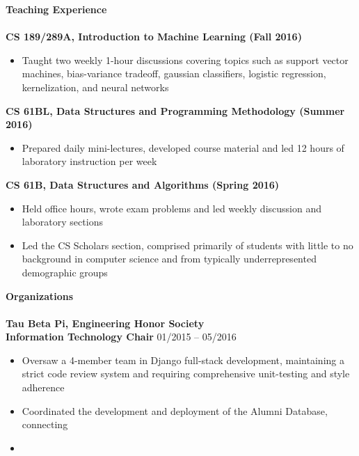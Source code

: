 \documentclass{article}
\begin{document}
\noindent
\textbf{{\Large Teaching Experience}}\\[-2mm]
\HRule\\
\textbf{CS 189/289A, Introduction to Machine Learning (Fall 2016)}
\begin{itemize}
\vspace{-1.8mm}
\item Taught two weekly 1-hour discussions covering topics such as support vector machines, bias-variance tradeoff, gaussian classifiers, logistic regression, kernelization, and neural networks
\end{itemize}
\textbf{CS 61BL, Data Structures and Programming Methodology (Summer 2016)}
\begin{itemize}
\vspace{-1.8mm}
\item Prepared daily mini-lectures, developed course material and led 12 hours of laboratory instruction per week
\end{itemize}
\textbf{CS 61B, Data Structures and Algorithms (Spring 2016)}
\begin{itemize}
\vspace{-1.8mm}
\item Held office hours, wrote exam problems and led weekly discussion and laboratory sections
\vspace{-2.5mm}
\item Led the CS Scholars section, comprised primarily of students with little to no background in computer science and from typically underrepresented demographic groups
\end{itemize}
\newpage

\noindent
\textbf{{\Large Organizations}}\\[-2mm]
\HRule\\
\textbf{Tau Beta Pi, Engineering Honor Society} \\
\textbf{Information Technology Chair}
\hfill 01/2015 -- 05/2016
\begin{itemize}
\vspace{-1.8mm}
\item Oversaw a 4-member team in Django full-stack development, maintaining a strict code review system and requiring comprehensive unit-testing and style adherence
\vspace{-2.5mm}
\item Coordinated the development and deployment of the Alumni Database, connecting 
\item 
\end{itemize}
\end{document}
